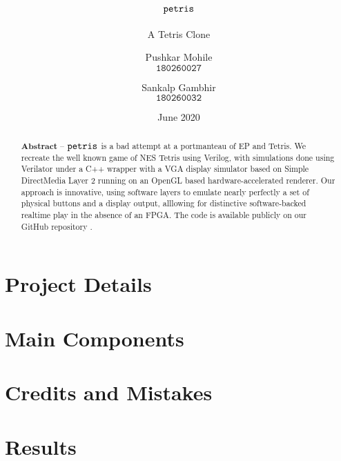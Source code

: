 \documentclass[10pt, a4paper, egregdoesnotlikesansseriftitles]{scrartcl}
\title{$\texttt{petris}$}
\subtitle{A Tetris Clone}
\author{
    Pushkar Mohile \\
    $\texttt{180260027}$
    \and
    Sankalp Gambhir \\
    $\texttt{180260032}$
    }
\date{June 2020}
\begin{document}
\maketitle

\begin{abstract}
    \centering
    $\textbf{Abstract --}$
    $\texttt{petris}$ is a bad attempt at a portmanteau of 
    EP and Tetris. We recreate the well known game of NES Tetris \cite{tetris}
    using Verilog, with simulations done using Verilator \cite{verilator} under
    a C++ wrapper with a VGA display simulator based on Simple DirectMedia Layer 2
    \cite{sdl2} running on an OpenGL based hardware-accelerated renderer. Our approach
    is innovative, using software layers to emulate nearly perfectly a set of
    physical buttons and a display output, alllowing for distinctive software-backed
    realtime play in the absence of an FPGA. The code is available publicly on our 
    GitHub repository \cite{petrisgit}.

\end{abstract}

  
\section{Project Details}


\section{Main Components}



\section{Credits and Mistakes}


\section{Results}

\end{document}
